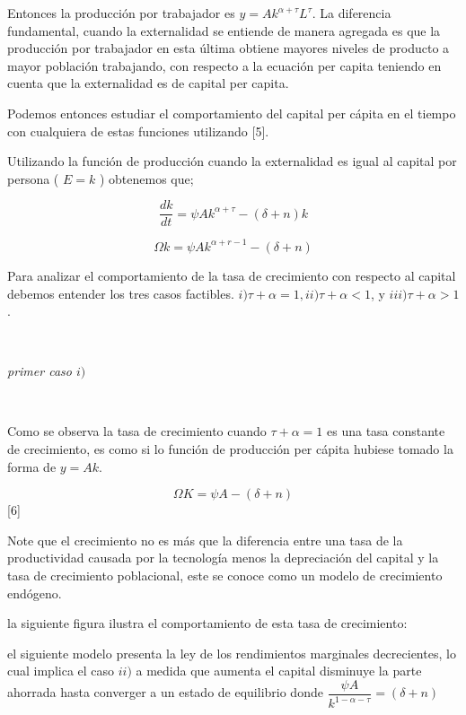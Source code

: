 \documentclass[12pt]{article}
\begin{document}
Entonces la producción por trabajador es $y= Ak^{\alpha + \tau }L^{ \tau}$. La diferencia fundamental, cuando la externalidad se entiende de manera agregada  es que la producción por trabajador en esta última   obtiene mayores niveles de producto a mayor población trabajando, con respecto a la ecuación per capita teniendo en cuenta que la externalidad es de capital per capita. 



Podemos entonces estudiar el comportamiento del capital per cápita en el tiempo  con cualquiera  de estas funciones utilizando [5].



Utilizando la función de producción cuando la externalidad es igual al capital por persona ( $E=k$ ) obtenemos que; 

$$
\dfrac{dk}{dt}= \psi Ak^{\alpha + \tau}-(\delta + n ) k$$



$$\Omega k= \psi A k^{\alpha+r-1}-(\delta + n)$$

Para analizar el comportamiento de la tasa de crecimiento con respecto al capital debemos entender los tres casos factibles. $i) \tau + \alpha =1, ii) \tau + \alpha < 1 $, y $iii) \tau + \alpha > 1$.

\
\
       
\textit{primer caso $i)$}

\


Como se observa la tasa de crecimiento cuando $\tau + \alpha =1$ es  una tasa constante de crecimiento, es como si lo función de producción per cápita hubiese tomado la forma de $y=Ak$.

$$\Omega K = \psi A - (\delta + n)$$ [6]




Note que el crecimiento no es más que la diferencia entre una tasa de la productividad causada por la tecnología menos la depreciación del capital y la tasa de crecimiento poblacional, este se conoce como un modelo de crecimiento endógeno.


la siguiente figura ilustra el comportamiento de esta tasa de crecimiento:



el siguiente modelo presenta la ley de los rendimientos marginales decrecientes, lo cual implica el caso $ii)$ a medida que aumenta el capital disminuye la parte ahorrada hasta converger a un estado de equilibrio donde 
$\dfrac{\psi A}{k^{1 - \alpha - \tau}}=(\delta + n)$
\end{document}
